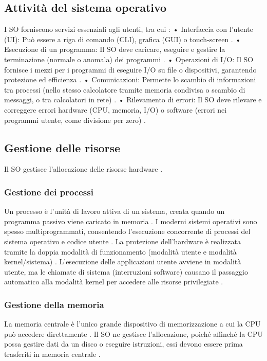\documentclass[12pt,a4paper, openany]{book}
\begin{document}
\begin{small}
		\subsection{Attività del sistema operativo} I SO forniscono servizi essenziali agli utenti, tra cui
		:
		\newline
		• Interfaccia con l'utente (UI): Può essere a riga di comando 
		(CLI), grafica (GUI) o touch-screen
		.
		\newline
		• Esecuzione di un programma: Il SO deve caricare, eseguire e gestire la terminazione (normale o anomala) dei programmi
		.
		\newline
		• Operazioni di I/O: Il SO fornisce i mezzi per i programmi di eseguire I/O su file o dispositivi, garantendo protezione ed efficienza
		.
		\newline
		• Comunicazioni: Permette lo scambio di informazioni tra processi (nello stesso calcolatore tramite memoria condivisa o scambio di messaggi, o tra calcolatori in rete)
		.
		\newline
		• Rilevamento di errori: Il SO deve rilevare e correggere errori hardware (CPU, memoria, I/O) o software (errori nei programmi utente, come divisione per zero)
		.
		\newline
		\subsection{Gestione delle risorse} Il SO gestisce l'allocazione delle risorse hardware
		.
		\subsubsection{Gestione dei processi} Un processo è l'unità di lavoro attiva di un sistema, creata quando un programma passivo viene caricato in memoria
		. I moderni sistemi operativi sono spesso multiprogrammati, consentendo l'esecuzione concorrente di processi del sistema operativo e codice utente
		.
		La protezione dell'hardware è realizzata tramite la doppia modalità di funzionamento (modalità utente e modalità kernel/sistema)
		. L'esecuzione delle applicazioni utente avviene in modalità utente, ma le chiamate di sistema (interruzioni software) causano il passaggio automatico alla modalità kernel per accedere alle risorse privilegiate
		.
		\subsubsection{Gestione della memoria} La memoria centrale è l'unico grande dispositivo di memorizzazione a cui la CPU può accedere direttamente
		. Il SO ne gestisce l'allocazione, poiché affinché la CPU possa gestire dati da un disco o eseguire istruzioni, essi devono essere prima trasferiti in memoria centrale
		.

\end{small}
\end{document}
